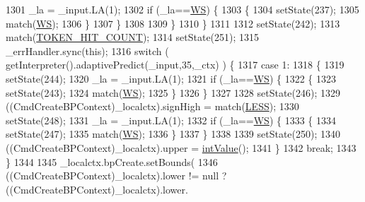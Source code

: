 \begin{DoxyCode}
1301           \_la = \_input.LA(1);
1302           \textcolor{keywordflow}{if} (\_la==\hyperlink{classgov_1_1nasa_1_1jpf_1_1inspector_1_1client_1_1parser_1_1_console_grammar_parser_a6914a3a3adbc350b12a7df9d1b24abf1}{WS}) \{
1303             \{
1304             setState(237);
1305             match(\hyperlink{classgov_1_1nasa_1_1jpf_1_1inspector_1_1client_1_1parser_1_1_console_grammar_parser_a6914a3a3adbc350b12a7df9d1b24abf1}{WS});
1306             \}
1307           \}
1308 
1309           \}
1310         \}
1311 
1312         setState(242);
1313         match(\hyperlink{classgov_1_1nasa_1_1jpf_1_1inspector_1_1client_1_1parser_1_1_console_grammar_parser_ad3f9231f91c3175f6ae827585e706c0f}{TOKEN\_HIT\_COUNT});
1314         setState(251);
1315         \_errHandler.sync(\textcolor{keyword}{this});
1316         \textcolor{keywordflow}{switch} ( getInterpreter().adaptivePredict(\_input,35,\_ctx) ) \{
1317         \textcolor{keywordflow}{case} 1:
1318           \{
1319           setState(244);
1320           \_la = \_input.LA(1);
1321           \textcolor{keywordflow}{if} (\_la==\hyperlink{classgov_1_1nasa_1_1jpf_1_1inspector_1_1client_1_1parser_1_1_console_grammar_parser_a6914a3a3adbc350b12a7df9d1b24abf1}{WS}) \{
1322             \{
1323             setState(243);
1324             match(\hyperlink{classgov_1_1nasa_1_1jpf_1_1inspector_1_1client_1_1parser_1_1_console_grammar_parser_a6914a3a3adbc350b12a7df9d1b24abf1}{WS});
1325             \}
1326           \}
1327 
1328           setState(246);
1329           ((CmdCreateBPContext)\_localctx).signHigh = match(\hyperlink{classgov_1_1nasa_1_1jpf_1_1inspector_1_1client_1_1parser_1_1_console_grammar_parser_ac325745c393b7e613626f2c93e95e486}{LESS});
1330           setState(248);
1331           \_la = \_input.LA(1);
1332           \textcolor{keywordflow}{if} (\_la==\hyperlink{classgov_1_1nasa_1_1jpf_1_1inspector_1_1client_1_1parser_1_1_console_grammar_parser_a6914a3a3adbc350b12a7df9d1b24abf1}{WS}) \{
1333             \{
1334             setState(247);
1335             match(\hyperlink{classgov_1_1nasa_1_1jpf_1_1inspector_1_1client_1_1parser_1_1_console_grammar_parser_a6914a3a3adbc350b12a7df9d1b24abf1}{WS});
1336             \}
1337           \}
1338 
1339           setState(250);
1340           ((CmdCreateBPContext)\_localctx).upper = \hyperlink{classgov_1_1nasa_1_1jpf_1_1inspector_1_1client_1_1parser_1_1_console_grammar_parser_a132b5d5236398d90d8d1e6b16dc0bd20}{intValue}();
1341           \}
1342           \textcolor{keywordflow}{break};
1343         \}
1344 
1345                 \_localctx.bpCreate.setBounds(
1346                     ((CmdCreateBPContext)\_localctx).lower != null ? ((CmdCreateBPContext)\_localctx).lower.

\end{DoxyCode}
